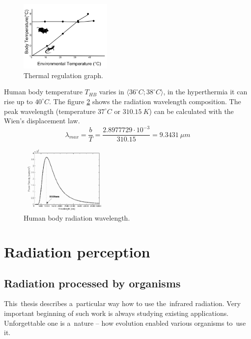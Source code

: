 \begin{figure}[h!]
\begin{center}
\includegraphics[width=0.4\textwidth]{img/thermoregulatory.png}
\caption{Thermal regulation graph.\label{fig:thermoregulatory}\cite{thermoregulatory}}
\end{center}    
\end{figure}

Human body temperature $T_{HB}$ varies in $\langle 36^{\circ}C; 38^{\circ}C \rangle$, in the hyperthermia
it can rise up to $40^{\circ}C$. The figure \ref{fig:bodywavelength} shows the radiation wavelength composition.
The peak wavelength (temperature $37^{\circ}C$ or $310.15~K$) can be calculated with the Wien's displacement law.
\begin{equation}
\lambda_{max}=\frac{b}{T}=\frac{2.8977729 \cdot 10^{-3}}{310.15} = 9.3431~\mu m
\end{equation}

\begin{figure}[h!]
\begin{center}
\includegraphics[width=0.4\textwidth]{img/bodyradiation.png}
\caption{Human body radiation wavelength.\cite{BodyRadiation}\label{fig:bodywavelength}}
\end{center}    
\end{figure}





\newpage
\section{Radiation perception}

\subsection*{Radiation processed by organisms}
This~thesis describes a~particular way how to use the~infrared radiation. Very important beginning of such
work is always studying existing applications. Unforgettable one is a~nature -- how evolution enabled 
various organisms to~use it.

